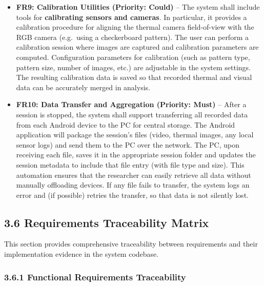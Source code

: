\documentclass[12pt,a4paper]{article}
\begin{document}
\begin{itemize}
\item
  \textbf{FR9: Calibration Utilities (Priority: Could)} -- The system shall include tools for \textbf{calibrating sensors and cameras}. In particular, it provides a calibration procedure for aligning the thermal camera field-of-view with the RGB camera (e.g.~using a checkerboard pattern). The user can perform a calibration session where images are captured and calibration parameters are computed. Configuration parameters for calibration (such as pattern type, pattern size, number of images, etc.) are adjustable in the system settings. The resulting calibration data is saved so that recorded thermal and visual data can be accurately merged in analysis.
\item
  \textbf{FR10: Data Transfer and Aggregation (Priority: Must)} -- After a session is stopped, the system shall support transferring all recorded data from each Android device to the PC for central storage. The Android application will package the session's files (video, thermal images, any local sensor logs) and send them to the PC over the network. The PC, upon receiving each file, saves it in the appropriate session folder and updates the session metadata to include that file entry (with file type and size). This automation ensures that the researcher can easily retrieve all data without manually offloading devices. If any file fails to transfer, the system logs an error and (if possible) retries the transfer, so that data is not silently lost.
\end{itemize}

\subsection{3.6 Requirements Traceability Matrix}\label{requirements-traceability-matrix}

This section provides comprehensive traceability between requirements and their implementation evidence in the system codebase.

\subsubsection{3.6.1 Functional Requirements Traceability}\label{functional-requirements-traceability}
\end{document}
